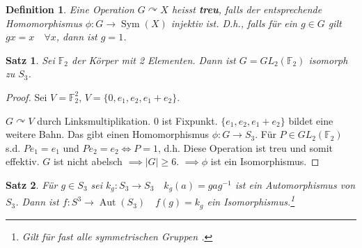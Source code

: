 \documentclass{article}
\theoremstyle{plain}
\newtheorem{definition}{Definition}
\newtheorem{theorem}{Satz}
\newcommand{\defn}[1]{\textbf{#1}}
\newcommand{\F}{\mathbb{F}}
\newcommand{\sym}{\mathop{\text{Sym}}}
\newcommand{\aut}{\mathop\text{Aut}}
\newcommand{\operateson}{\curvearrowright}
\begin{document}
\begin{definition}
    Eine Operation $G\operateson X$ heisst \defn{treu}, falls der entsprechende Homomorphismus $\phi\colon G\to \sym(X)$ injektiv ist.
    D.h., falls für ein $g\in G$ gilt $gx=x\quad \forall x$, dann ist $g=1$.
\end{definition}
\begin{theorem}
    Sei $\F_2$ der Körper mit 2 Elementen. Dann ist $G=GL_2(\F_2)$ isomorph zu $S_3$.
\end{theorem}
\begin{proof}
    Sei $V=\F_2^2$, $V=\{0,e_1,e_2,e_1+e_2\}$.

    $G\operateson V$ durch Linksmultiplikation. 0 ist Fixpunkt.
    $\{e_1, e_2, e_1+e_2\}$ bildet eine weitere Bahn.
    Das gibt einen Homomorphismus $\phi\colon G\to S_3$.
    Für $P\in GL_2(\F_2)$ s.d. $Pe_1=e_1$ und $Pe_2=e_2 \Leftrightarrow P=1$, d.h. Diese Operation ist treu und somit effektiv.
    $G$ ist nicht abelsch $\implies |G| \geq 6$. 
    $\implies \phi$ ist ein Isomorphismus.
\end{proof}
\begin{theorem}
    Für $g\in S_3$ sei $k_g:S_3\to S_3\quad k_g(a)=gag^{-1}$ ist ein Automorphismus von $S_3$.
    Dann ist $f\colon S^3\to\aut(S_3)\quad f(g)=k_g$ ein Isomorphismus.\footnote{Gilt für fast alle symmetrischen Gruppen 
    .}
\end{theorem}
\end{document}
